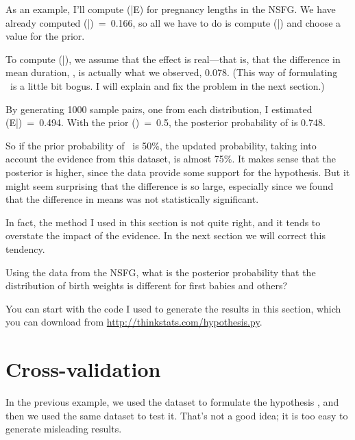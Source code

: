 \documentclass[12pt]{book}
\begin{document}
As an example, I'll compute \Prob(\HH{}|E) for pregnancy
lengths in the NSFG.  We have already computed
\Prob(\E|\HH{})~=~0.166, so all we have to do is compute
\Prob(\E|\HH{}) and choose a value for the prior.

To compute \Prob(\E|\HH{}), we assume that the effect is
real---that is,
that the difference in mean duration, \mydelta, is actually what we
observed, 0.078.  (This way of formulating \HH{}~is a little bit
bogus.  I will explain and fix the problem in the next section.)

By generating 1000 sample pairs, one from each
distribution, I estimated \Prob(E|\HH{})~=~0.494.  With the prior
\Prob(\HH{})~=~0.5, the posterior probability of \HH{} is 0.748.

So if the prior probability of \HH{}~is 50\%, the updated
probability, taking into account the evidence from this dataset,
is almost 75\%.  It makes sense that the posterior
is higher, since the data provide some support for the hypothesis.
But it might seem surprising that the difference is so large,
especially since we found that the difference in means was not
statistically significant.

In fact, the method I used in this section is not quite right, and
it tends to overstate the impact of the evidence.  In the next section
we will correct this tendency.

\begin{exercise}
Using the data from the NSFG, what is the posterior probability that
the distribution of birth weights is different for first babies and
others?

You can start with the code I used to generate the results in this
section, which you can download from \url{http://thinkstats.com/hypothesis.py}.

\end{exercise}


\section{Cross-validation}

In the previous example, we used the dataset to formulate the
hypothesis \HH{}, and then we used the same dataset to test it.
That's not a good idea; it is too easy to generate misleading results.
\end{document}
